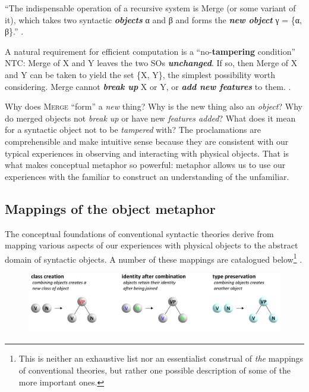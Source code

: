 “The indispensable operation of a recursive system is Merge (or some variant of it), which takes two syntactic \textbf{\textit{objects}} α and β and forms the \textbf{\textit{new object}} γ = \{α, β\}.” \citep[3]{Chomsky2001}.

A natural requirement for efficient computation is a “no-\textbf{tampering} condition” NTC: Merge of X and Y leaves the two SOs \textbf{\textit{unchanged}}. If so, then Merge of X and Y can be taken to yield the set \{X, Y\}, the simplest possibility worth considering. Merge cannot \textbf{\textit{break up}} X or Y, or \textbf{\textit{add new features}} to them. \citep[5-6]{Chomsky2008}.

  Why does \textsc{Merge} “form” a \textit{new} thing? Why is the new thing also an \textit{object}? Why do merged objects not \textit{break up} or have new \textit{features added}? What does it mean for a syntactic object not to be \textit{tampered} with? The proclamations are comprehensible and make intuitive sense because they are consistent with our typical experiences in observing and interacting with physical objects. That is what makes conceptual metaphor so powerful: metaphor allows us to use our experiences with the familiar to construct an understanding of the unfamiliar. 

\subsection{Mappings of the object metaphor}

The conceptual foundations of conventional syntactic theories derive from mapping various aspects of our experiences with physical objects to the abstract domain of syntactic objects. A number of these mappings are catalogued below\footnote{This is neither an exhaustive list nor an essentialist construal of \textit{the} mappings of conventional theories, but rather one possible description of some of the more important ones.} .

  
\begin{figure}
\includegraphics[width=\textwidth]{figures/Tilsen-img29.png}
\caption{\missingcaption}
\label{fig:}
\end{figure}
 


